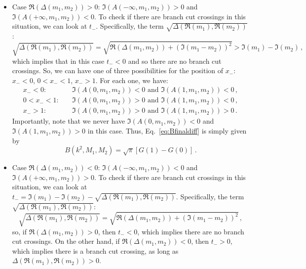 \documentclass[twoside]{article}
\begin{document}
\begin{itemize}
\item Case $\Re(\Delta(m_1,m_2)) > 0$: 
$\Im\left(A\left(-\infty, m_1, m_2\right)\right) > 0$ and $\Im\left(A\left(+\infty, m_1, m_2\right)\right) < 0$. To check if there are branch cut crossings in this situation, we can look at $t_-$. Specifically, the term $\sqrt{\Delta(\Re(m_1), \Re(m_2))}$:
\begin{equation}
\sqrt{\Delta(\Re(m_1), \Re(m_2))} = \sqrt{\Re(\Delta(m_1,m_2)) + (\Im(m_1-m_2))^2} > \Im(m_1) - \Im(m_2)\,,
\end{equation}
which implies that in this case $t_- < 0$ and so there are no branch cut crossings. So, we can have one of three possibilities for the position of $x_-$: $x_- < 0$, $0 < x_- < 1$, $x_- > 1$. For each one, we have:
\begin{align*}
x_- < 0: &\quad \Im\left(A\left(0, m_1, m_2\right)\right) < 0 \text{ and } \Im\left(A\left(1, m_1, m_2\right)\right) < 0\,, \\
0 < x_- < 1: &\quad \Im\left(A\left(0, m_1, m_2\right)\right) > 0 \text{ and } \Im\left(A\left(1, m_1, m_2\right)\right) < 0 \,,\\
x_- > 1: &\quad \Im\left(A\left(0, m_1, m_2\right)\right) > 0 \text{ and } \Im\left(A\left(1, m_1, m_2\right)\right) > 0 \,.
\end{align*}
Importantly, note that we never have $\Im\left(A\left(0, m_1, m_2\right)\right) < 0$ and $\Im\left(A\left(1, m_1, m_2\right)\right) > 0$ in this case.
Thus, Eq.~\eqref{eq:Bfinaldiff} is simply given by 
\begin{equation}
B(k^2,M_1,M_2) = \sqrt{\pi}\left[G(1) - G(0) \right]\,.
\end{equation}

\item Case $\Re(\Delta(m_1,m_2)) < 0$: 
$\Im\left(A\left(-\infty, m_1, m_2\right)\right) < 0$ and $\Im\left(A\left(+\infty, m_1, m_2\right)\right) > 0$. To check if there are branch cut crossings in this situation, we can look at $t_- = \Im(m_1)-\Im(m_2) -\sqrt{\Delta(\Re(m_1), \Re(m_2))}$. Specifically, the term $\sqrt{\Delta(\Re(m_1), \Re(m_2))}$:
\begin{equation}
\sqrt{\Delta(\Re(m_1), \Re(m_2))} = \sqrt{\Re(\Delta(m_1,m_2)) + (\Im(m_1-m_2))^2}\,,
\end{equation}
so, if $\Re(\Delta(m_1,m_2)) > 0$, then $t_- < 0$, which implies there are no branch cut crossings. On the other hand, if $\Re(\Delta(m_1,m_2)) < 0$, then $t_- > 0$, which implies there is a branch cut crossing, as long as $\Delta(\Re(m_1), \Re(m_2)) > 0$.


\end{itemize}
\end{document}
